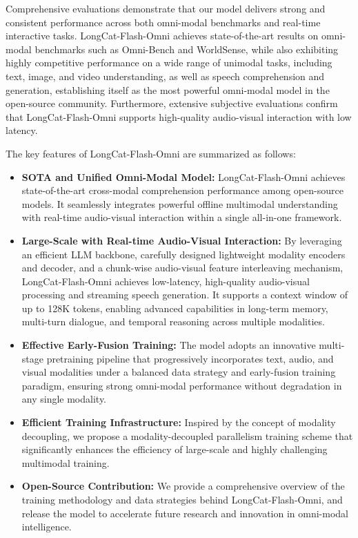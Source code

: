 \documentclass{article}
\newcommand{\longcat}{LongCat-Flash-Omni\xspace}
\begin{document}
Comprehensive evaluations demonstrate that our model delivers strong and consistent performance across both omni-modal benchmarks and real-time interactive tasks. \longcat achieves state-of-the-art results on omni-modal benchmarks such as Omni-Bench and WorldSense, while also exhibiting highly competitive performance on a wide range of unimodal tasks, including text, image, and video understanding, as well as speech comprehension and generation, establishing itself as the most powerful omni-modal model in the open-source community.
Furthermore, extensive subjective evaluations confirm that \longcat supports high-quality audio-visual interaction with low latency.

The key features of \longcat are summarized as follows:
\begin{itemize}
    \item \textbf{SOTA and Unified Omni-Modal Model:} \longcat achieves state-of-the-art cross-modal comprehension performance among open-source models. It seamlessly integrates powerful offline multimodal understanding with real-time audio-visual interaction within a single all-in-one framework. 
    \item \textbf{Large-Scale with Real-time Audio-Visual Interaction:} By leveraging an efficient LLM backbone, carefully designed lightweight modality encoders and decoder, and a chunk-wise audio-visual feature interleaving mechanism, \longcat achieves low-latency, high-quality audio-visual processing and streaming speech generation. It supports a context window of up to 128K tokens, enabling advanced capabilities in long-term memory, multi-turn dialogue, and temporal reasoning across multiple modalities.
    \item \textbf{Effective Early-Fusion Training:} The model adopts an innovative multi-stage pretraining pipeline that progressively incorporates text, audio, and visual modalities under a balanced data strategy and early-fusion training paradigm, ensuring strong omni-modal performance without degradation in any single modality.
    \item \textbf{Efficient Training Infrastructure:} Inspired by the concept of modality decoupling, we propose a modality-decoupled parallelism training scheme that significantly enhances the efficiency of large-scale and highly challenging multimodal training.
    \item \textbf{Open-Source Contribution:} We provide a comprehensive overview of the training methodology and data strategies behind \longcat, and release the model to accelerate future research and innovation in omni-modal intelligence.
\end{itemize}
\end{document}
